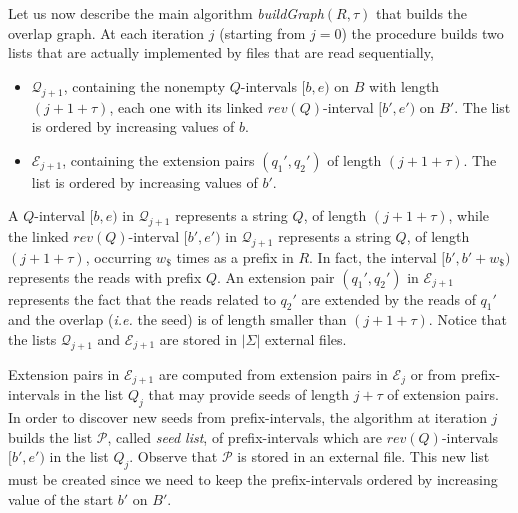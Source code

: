 \documentclass[runningheads,envcountsame,a4paper]{llncs}
\newcommand{\ie}{\textit{i.e.}\xspace}
\begin{document}
Let us now describe the main algorithm  \emph{buildGraph$(R, \tau)$} that
builds the overlap graph.
At each iteration $j$ (starting from $j=0$) the procedure builds  two  lists
that are actually implemented by files that are read sequentially,

\begin{itemize}
\item $\mathcal{Q}_{j+1}$, containing the nonempty $Q$-intervals $[b, e)$ on $B$ with length $(j+ 1 + \tau)$,
each one with its linked
  $rev(Q)$-interval $[b', e')$ on $B'$. The list is  ordered by increasing values of $b$.
\item $\mathcal{E}_{j +1}$, containing the extension pairs $(q_{1}', q_{2}')$ of
  length $(j+1 +\tau)$.  The list is ordered by increasing values of $b'$.

\end{itemize}

A $Q$-interval  $[b,e)$ in $\mathcal{Q}_{j+1}$ represents a
string $Q$, of length $(j+1 +\tau)$, while
the linked $rev(Q)$-interval  $[b',e')$ in $\mathcal{Q}_{j+1}$  represents a
string $Q$, of length $(j+1+ \tau)$, occurring $w_\$$ times as a prefix in $R$.
In fact,   the interval $[b',b'+w_\$)$ represents the reads with prefix $Q$.
An extension pair $(q_{1}', q_{2}')$ in $\mathcal{E}_{j+1}$ represents the fact
that the reads related to $q_{2}'$ are extended by the reads of $q_{1}'$ and the
overlap (\ie the seed) is of length smaller than $(j+1+\tau)$.
Notice that the lists $\mathcal{Q}_{j+1}$ and  $\mathcal{E}_{j+1}$ are stored in $|\Sigma|$ external files.

Extension pairs in $\mathcal{E}_{j+1}$ are computed from extension pairs
in  $\mathcal{E}_{j}$ or from prefix-intervals in the list $Q_j$ that may
provide seeds of length $j + \tau$ of extension pairs.
In order to discover new seeds from prefix-intervals, the algorithm at iteration
$j$  builds the list $\mathcal{P}$, called {\em seed list},  of prefix-intervals  which are $rev(Q)$-intervals $[b', e')$ in the list $Q_j$. Observe that  $\mathcal{P}$   is  stored in an external file.
This new list must be created since we need to keep the prefix-intervals ordered by
increasing value of the start $b'$ on $B'$.
\end{document}
